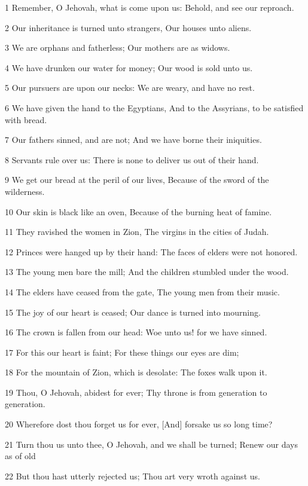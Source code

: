 \par 1 Remember, O Jehovah, what is come upon us: Behold, and see our reproach.
\par 2 Our inheritance is turned unto strangers, Our houses unto aliens.
\par 3 We are orphans and fatherless; Our mothers are as widows.
\par 4 We have drunken our water for money; Our wood is sold unto us.
\par 5 Our pursuers are upon our necks: We are weary, and have no rest.
\par 6 We have given the hand to the Egyptians, And to the Assyrians, to be satisfied with bread.
\par 7 Our fathers sinned, and are not; And we have borne their iniquities.
\par 8 Servants rule over us: There is none to deliver us out of their hand.
\par 9 We get our bread at the peril of our lives, Because of the sword of the wilderness.
\par 10 Our skin is black like an oven, Because of the burning heat of famine.
\par 11 They ravished the women in Zion, The virgins in the cities of Judah.
\par 12 Princes were hanged up by their hand: The faces of elders were not honored.
\par 13 The young men bare the mill; And the children stumbled under the wood.
\par 14 The elders have ceased from the gate, The young men from their music.
\par 15 The joy of our heart is ceased; Our dance is turned into mourning.
\par 16 The crown is fallen from our head: Woe unto us! for we have sinned.
\par 17 For this our heart is faint; For these things our eyes are dim;
\par 18 For the mountain of Zion, which is desolate: The foxes walk upon it.
\par 19 Thou, O Jehovah, abidest for ever; Thy throne is from generation to generation.
\par 20 Wherefore dost thou forget us for ever, [And] forsake us so long time?
\par 21 Turn thou us unto thee, O Jehovah, and we shall be turned; Renew our days as of old
\par 22 But thou hast utterly rejected us; Thou art very wroth against us.

